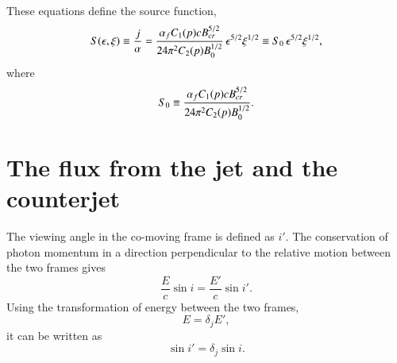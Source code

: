 These equations define the source function,
\begin{equation}
S(\epsilon, \xi) \equiv \frac{j}{\alpha} = \dfrac{\alpha_f C_1(p) c B_{cr}^{5/2}}{24 \pi^2 C_2(p) B_0^{1/2}} \, \epsilon^{5/2} \xi^{1/2} \equiv S_0 \, \epsilon^{5/2} \xi^{1/2} ,
\label{eq:source_function}
\end{equation} where
\begin{equation}
S_0 \equiv \dfrac{\alpha_f C_1(p) c B_{cr}^{5/2}}{24 \pi^2 C_2(p) B_0^{1/2}}.
\label{eq:Szero}
\end{equation}



\section{The flux from the jet and the counterjet}
\label{sec:flux_calculation}
The viewing angle in the co-moving frame is defined as $i'$. The conservation of photon momentum in a direction perpendicular to the relative motion between the two frames gives
\begin{equation}
\frac{E}{c} \sin i = \frac{E'}{c} \sin i'.
\end{equation}
Using the transformation of energy between the two frames,
\begin{equation}
E = \delta_j E',
\end{equation}
it can be written as
\begin{equation}
\sin i' = \delta_j \sin i.
\end{equation}

